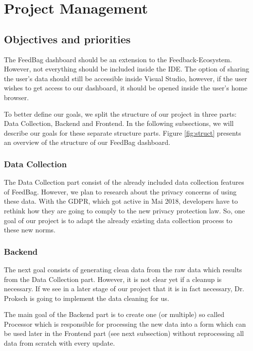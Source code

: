 \documentclass{seal_article}
\begin{document}
\section{Project Management}

\subsection{Objectives and priorities}
The FeedBag dashboard should be an extension to the Feedback-Ecosystem. However, not everything should be included inside the IDE. The option of sharing the user’s data should still be accessible inside Visual Studio, however, if the user wishes to get access to our dashboard, it should be opened inside the user’s home browser.

To better define our goals, we split the structure of our project in three parts: Data Collection, Backend and Frontend. In the following subsections, we will describe our goals for these separate structure parts. Figure \ref{fig:struct} presents an overview of the structure of our FeedBag dashboard.

\subsubsection{Data Collection}
The Data Collection part consist of the already included data collection features of FeedBag. However, we plan to research about the privacy concerns of using these data. With the GDPR, which got active in Mai 2018, developers have to rethink how they are going to comply to the new privacy protection law. So, one goal of our project is to adapt the already existing data collection process to these new norms.

\subsubsection{Backend}
The next goal consists of generating clean data from the raw data which results from the Data Collection part. However, it is not clear yet if a cleanup is necessary. If we see in a later stage of our project that it is in fact necessary, Dr. Proksch is going to implement the data cleaning for us.

The main goal of the Backend part is to create one (or multiple) so called Processor which is responsible for processing the new data into a form which can be used later in the Frontend part (see next subsection) without reprocessing all data from scratch with every update.
\end{document}
